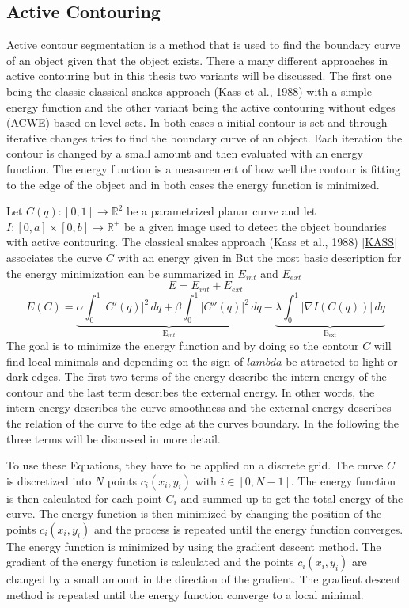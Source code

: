 \subsection{Active Contouring}
Active contour segmentation is a method that is used to find the boundary curve of an object given that the object exists. There a many different approaches in active contouring but in this thesis two variants will be discussed. The first one being the classic classical snakes approach (Kass et al., 1988) with a simple energy function and the other variant being the active contouring without edges (ACWE) based on level sets. In both cases a initial contour is set and through iterative changes tries to find the boundary curve of an object. Each iteration the contour is changed by a small amount and then evaluated with an energy function. The energy function is a measurement of how well the contour is fitting to the edge of the object and in both cases the energy function is minimized.

Let $C(q): [0, 1] \rightarrow \mathbb{R}^2$ be a parametrized planar curve and let $I : [0, a] \times [0, b] \rightarrow \mathbb{R}^+$ be a given image used to detect the object boundaries with active contouring. The classical snakes approach (Kass et al., 1988) \ref{KASS} associates the curve $C$ with an energy given in 
But the most basic description for the energy minimization can be summarized in $E_{int}$ and $E_{ext}$ 
\begin{equation}
    E = E_{int} + E_{ext}
    \label{energy}
\end{equation}
\begin{equation}
        E(C) = \underbrace{\alpha \int_0^1 |C'(q)|^2 \, dq + \beta \int_0^1 |C''(q)|^2 \, dq}_{\text{E}_{int}} - \underbrace{\lambda \int_0^1 |\nabla I (C(q))| \, dq}_{\text{E}_{\text{ext}}}
\label{acgd}
\end{equation}
The goal is to minimize the energy function and by doing so the contour $C$ will find local minimals and depending on the sign of $lambda$ be attracted to light or dark edges. The first two terms of the energy describe the intern energy of the contour and the last term describes the external energy. In other words, the intern energy describes the curve smoothness and the external energy describes the relation of the curve to the edge at the curves boundary. In the following the three terms will be discussed in more detail.

To use these Equations, they have to be applied on a discrete grid. The curve $C$ is discretized into $N$ points  $c_i(x_i,y_i)$ with $i \in [0, N-1]$. The energy function is then calculated for each point $C_i$ and summed up to get the total energy of the curve. The energy function is then minimized by changing the position of the points $c_i(x_i,y_i)$ and the process is repeated until the energy function converges. The energy function is minimized by using the gradient descent method. The gradient of the energy function is calculated and the points $c_i(x_i,y_i)$ are changed by a small amount in the direction of the gradient. The gradient descent method is repeated until the energy function converge to a local minimal. 

